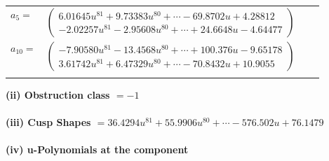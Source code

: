 \documentclass[1p]{elsarticle_modified}
\theoremstyle{definition}
\begin{document}
\begin{tabular}{m{7pt} m{180pt} m{7pt} m{180pt} }
\flushright $a_{5}=$&$\begin{pmatrix}6.01645 u^{81}+9.73383 u^{80}+\cdots-69.8702 u+4.28812\\-2.02257 u^{81}-2.95608 u^{80}+\cdots+24.6648 u-4.64477\end{pmatrix}$ \\
\flushright $a_{10}=$&$\begin{pmatrix}-7.90580 u^{81}-13.4568 u^{80}+\cdots+100.376 u-9.65178\\3.61742 u^{81}+6.47329 u^{80}+\cdots-70.8432 u+10.9055\end{pmatrix}$\\&\end{tabular}
\flushleft \textbf{(ii) Obstruction class $= -1$}\\~\\
\flushleft \textbf{(iii) Cusp Shapes $= 36.4294 u^{81}+55.9906 u^{80}+\cdots-576.502 u+76.1479$}\\~\\
\newpage\renewcommand{\arraystretch}{1}
\flushleft \textbf{(iv) u-Polynomials at the component}\newline \\
\end{document}
